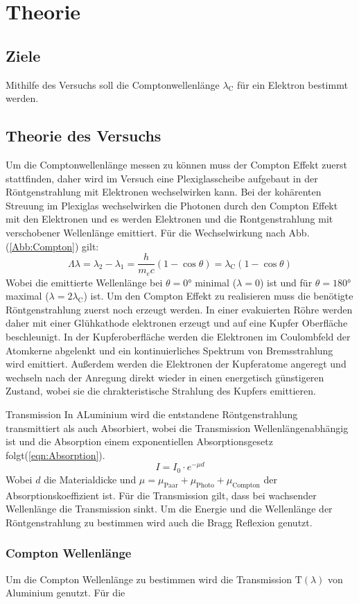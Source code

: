 \section{Theorie}
\label{sec:theorie}
\subsection{Ziele}
Mithilfe des Versuchs soll die Comptonwellenlänge $\lambda_{\text{C}}$ für ein Elektron bestimmt werden.
\subsection{Theorie des Versuchs}
Um die Comptonwellenlänge messen zu können muss der Compton Effekt zuerst stattfinden, 
daher wird im Versuch eine Plexiglasscheibe aufgebaut in der Röntgenstrahlung mit Elektronen wechselwirken kann.
Bei der kohärenten Streuung im Plexiglas wechselwirken die Photonen durch den Compton Effekt mit den Elektronen
und es werden Elektronen und die Rontgenstrahlung mit verschobener Wellenlänge emittiert.
Für die Wechselwirkung nach Abb. (\ref{Abb:Compton}) gilt:
\begin{equation}
    \Lambda \lambda = \lambda_2 - \lambda_1
                    = \frac{h}{m_e c}\left( 1- \cos \theta \right) 
                    = \lambda_{\text{C}} \left( 1- \cos \theta \right) \label{eqn:wellenlänge} 
\end{equation}
Wobei die emittierte Wellenlänge bei $\theta = 0°$ minimal ($\lambda = 0$) ist und für $\theta = 180°$ maximal ($\lambda = 2\lambda_{\text{C}}$) ist.
Um den Compton Effekt zu realisieren muss die benötigte Röntgenstrahlung zuerst noch erzeugt werden.
In einer evakuierten Röhre werden daher mit einer Glühkathode elektronen erzeugt und auf eine Kupfer Oberfläche beschleunigt.
In der Kupferoberfläche werden die Elektronen im Coulombfeld der Atomkerne abgelenkt und ein kontinuierliches Spektrum von Bremsstrahlung wird emittiert.
Außerdem werden die Elektronen der Kupferatome angeregt und wechseln nach der Anregung direkt wieder in einen energetisch günstigeren Zustand, wobei sie die chrakteristische Strahlung des Kupfers emittieren.

Transmission 
In ALuminium wird die entstandene Röntgenstrahlung transmittiert als auch Absorbiert, wobei die Transmission Wellenlängenabhängig ist und die Absorption einem exponentiellen Absorptionsgesetz folgt(\ref{eqn:Absorption}).
\begin{equation}
    I = I_0 \cdot e^{-\mu d} \label{eqn:Absorption}
\end{equation}
Wobei $d$ die Materialdicke und $\mu = \mu_{\text{Paar}}+\mu_{\text{Photo}}+\mu_{\text{Compton}}$ der Absorptionskoeffizient ist.
Für die Transmission gilt, dass bei wachsender Wellenlänge die Transmission sinkt.
Um die Energie und die Wellenlänge der Röntgenstrahlung zu bestimmen wird auch die Bragg Reflexion genutzt.

\subsubsection{Compton Wellenlänge}
Um die Compton Wellenlänge zu bestimmen wird die Transmission $\text{T}(\lambda)$ von Aluminium genutzt.
Für die 

